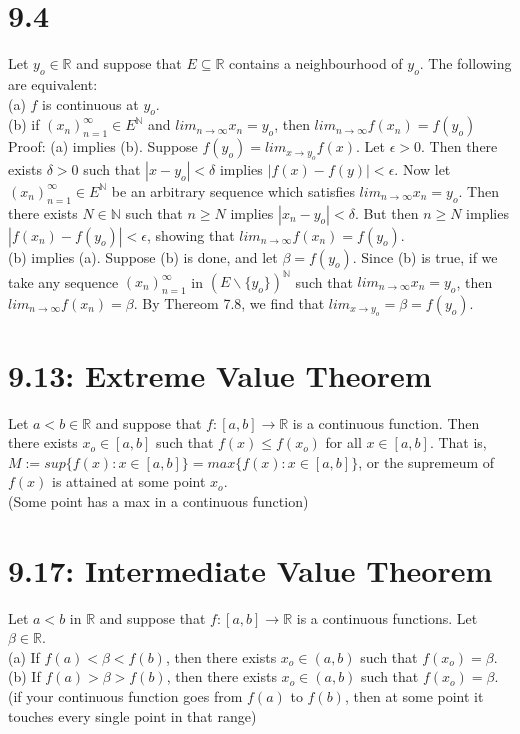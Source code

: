 \documentclass[10pt,letter]{report}
\begin{document}
\section*{9.4}
Let $y_o\in\mathbb{R}$ and suppose that $E\subseteq\mathbb{R}$ contains a neighbourhood of $y_o$. The following are equivalent: \\ 
(a) $f$ is continuous at $y_o$. \\ 
(b) if $(x_n)_{n=1}^\infty\in E^\mathbb{N}$ and $lim_{n\rightarrow\infty}x_n=y_o$, then $lim_{n\rightarrow\infty}f(x_n)=f(y_o)$ \\ 
Proof: (a) implies (b). Suppose $f(y_o) = lim_{x\rightarrow y_o}f(x)$. Let $\epsilon>0$. Then there exists $\delta>0$ such that $|x-y_o|<\delta$ implies $|f(x)-f(y)|<\epsilon$. Now let $(x_n)_{n=1}^\infty\in E^\mathbb{N}$ be an arbitrary sequence which satisfies $lim_{n\rightarrow\infty}x_n=y_o$. Then there exists $N\in\mathbb{N}$ such that $n\geq N$ implies $|x_n-y_o|<\delta$. But then $n\geq N$ implies $|f(x_n)-f(y_o)|<\epsilon$, showing that $lim_{n\rightarrow\infty}f(x_n) = f(y_o)$. \\ 
(b) implies (a). Suppose (b) is done, and let $\beta=f(y_o)$. Since (b) is true, if we take any sequence $(x_n)_{n=1}^\infty$ in $(E\backslash\{y_o\})^\mathbb{N}$ such that $lim_{n\rightarrow\infty}x_n = y_o$, then $lim_{n\rightarrow\infty}f(x_n)  = \beta$. By Thereom 7.8, we find that $lim_{x\rightarrow y_o}=\beta = f(y_o)$. 

\section*{9.13: Extreme Value Theorem}
Let $a<b\in\mathbb{R}$ and suppose that $f:[a,b]\rightarrow\mathbb{R}$ is a continuous function. Then there exists $x_o\in[a,b]$ such that $f(x)\leq f(x_o)$ for all $x\in[a,b]$. That is, $M:=sup\{f(x):x\in[a,b]\}=max\{f(x):x\in[a,b]\}$, or the supremeum of $f(x)$ is attained at some point $x_o$. \\ 
(Some point has a max in a continuous function)

\section*{9.17: Intermediate Value Theorem}
Let $a<b$ in $\mathbb{R}$ and suppose that $f:[a,b]\rightarrow\mathbb{R}$ is a continuous functions. Let $\beta\in\mathbb{R}$. \\ 
(a) If $f(a)<\beta<f(b)$, then there exists $x_o\in(a,b)$ such that $f(x_o)=\beta$. \\ 
(b) If $f(a)>\beta>f(b)$, then there exists $x_o\in(a,b)$ such that $f(x_o)=\beta$. \\ 
(if your continuous function goes from $f(a)$ to $f(b)$, then at some point it touches every single point in that range)
\end{document}
